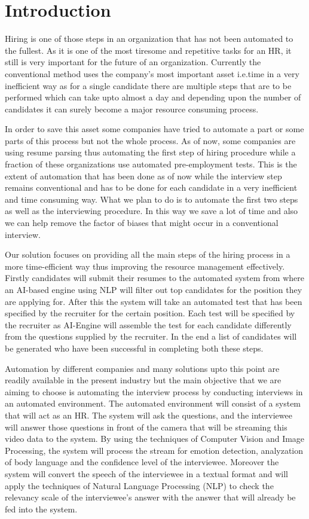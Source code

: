 \section{Introduction}
Hiring is one of those steps in an organization that has not been automated to the fullest. As it is one of the most tiresome and repetitive tasks for an HR, it still is very important for the future of an organization. Currently the conventional method uses the company’s most important asset i.e.time in a very inefficient way as for a single candidate there are multiple steps that are to be performed which can take upto almost a day and depending upon the number of candidates it can surely become a major resource consuming process.
\par
In order to save this asset some companies have tried to automate a part or some parts of this process but not the whole process. As of now, some companies are using resume parsing\cite{bhatia2019end} thus automating the first step of hiring procedure while a fraction of these organizations use automated pre-employment tests. This is the extent of automation that has been done as of now while the interview step remains conventional and has to be done for each candidate in a very inefficient and time consuming way. What we plan to do is to automate the first two steps as well as the interviewing procedure. In this way we save a lot of time and also we can help remove the factor of biases that might occur in a conventional interview.
\par
Our solution focuses on providing all the main steps of the hiring process in a more time-efficient way thus improving the resource management effectively. Firstly candidates will submit their resumes to the automated system from where an AI-based engine using NLP\cite{sanyal2017resume} will filter out top candidates for the position they are applying for. After this the system will take an automated test that has been specified by the recruiter for the certain position. Each test will be specified by the recruiter as AI-Engine will assemble the test for each candidate differently from the questions supplied by the recruiter. In the end a list of candidates will be generated who have been successful in completing both these steps. 
\par
Automation by different companies and many solutions upto this point are readily available in the present industry but the main objective that we are aiming to choose is automating the interview process by conducting interviews in an automated environment. The automated environment will consist of a system that will act as an HR. The system will ask the questions, and the interviewee will answer those questions in front of the camera that will be streaming this video data to the system. By using the techniques of Computer Vision and Image Processing, the system will process the stream for emotion detection, analyzation of body language and the confidence level of the interviewee. Moreover the system will convert the speech of the interviewee in a textual format and will apply the techniques of Natural Language Processing (NLP) to check the relevancy scale of the interviewee’s answer with the answer that will already be fed into the system.
